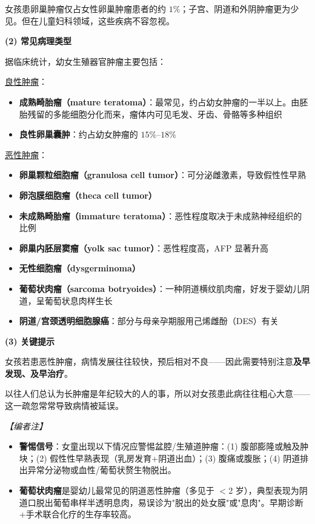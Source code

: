 \begin{enumerate}
女孩患卵巢肿瘤仅占女性卵巢肿瘤患者的约 $1\%$；子宫、阴道和外阴肿瘤更为少见。但在儿童妇科领域，这些疾病不容忽视。

\vspace{0.3em}
\noindent\textbf{(2) 常见病理类型}

据临床统计，幼女生殖器官肿瘤主要包括：

\underline{良性肿瘤}：
\begin{itemize}
	\item \textbf{成熟畸胎瘤（mature teratoma）}：最常见，约占幼女肿瘤的一半以上。由胚胎残留的多能细胞分化而来，瘤体内可见毛发、牙齿、骨骼等多种组织
	\item \textbf{良性卵巢囊肿}：约占幼女肿瘤的 $15\%$--$18\%$
\end{itemize}

\underline{恶性肿瘤}：
\begin{itemize}
	\item \textbf{卵巢颗粒细胞瘤（granulosa cell tumor）}：可分泌雌激素，导致假性性早熟
	\item \textbf{卵泡膜细胞瘤（theca cell tumor）}
	\item \textbf{未成熟畸胎瘤（immature teratoma）}：恶性程度取决于未成熟神经组织的比例
	\item \textbf{卵巢内胚层窦瘤（yolk sac tumor）}：恶性程度高，AFP 显著升高
	\item \textbf{无性细胞瘤（dysgerminoma）}
	\item \textbf{葡萄状肉瘤（sarcoma botryoides）}：一种阴道横纹肌肉瘤，好发于婴幼儿阴道，呈葡萄状息肉样生长
	\item \textbf{阴道/宫颈透明细胞腺癌}：部分与母亲孕期服用己烯雌酚（DES）有关
\end{itemize}

\vspace{0.3em}
\noindent\textbf{(3) 关键提示}

女孩若患恶性肿瘤，病情发展往往较快，预后相对不良——因此需要特别注意\textbf{及早发现、及早治疗}。

以往人们总认为长肿瘤是年纪较大的人的事，所以对女孩患此病往往粗心大意——这一疏忽常常导致病情被延误。

\vspace{0.3em}
\noindent\textit{【编者注】}
\begin{itemize}
	\item \textbf{警惕信号}：女童出现以下情况应警惕盆腔/生殖道肿瘤：(1) 腹部膨隆或触及肿块；(2) 假性性早熟表现（乳房发育+阴道出血）；(3) 腹痛或腹胀；(4) 阴道排出异常分泌物或血性/葡萄状赘生物脱出。
	\item \textbf{葡萄状肉瘤}是婴幼儿最常见的阴道恶性肿瘤（多见于 $<$2 岁），典型表现为阴道口脱出葡萄串样半透明息肉，易误诊为"脱出的处女膜"或"息肉"。早期诊断+手术联合化疗的生存率较高。
\end{itemize}


\end{enumerate}
